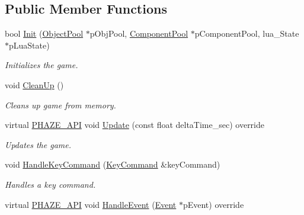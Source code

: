 \subsection*{Public Member Functions}
\begin{DoxyCompactItemize}
\item 
bool \mbox{\hyperlink{class_game_a083fc4d208482811d5dd6efb5c7fbaf4}{Init}} (\mbox{\hyperlink{class_object_pool}{Object\+Pool}} $\ast$p\+Obj\+Pool, \mbox{\hyperlink{class_component_pool}{Component\+Pool}} $\ast$p\+Component\+Pool, lua\+\_\+\+State $\ast$p\+Lua\+State)
\begin{DoxyCompactList}\small\item\em Initializes the game. \end{DoxyCompactList}\item 
\mbox{\label{class_game_afe8f2a4980f240bbfba8c1f495ff5075}} 
void \mbox{\hyperlink{class_game_afe8f2a4980f240bbfba8c1f495ff5075}{Clean\+Up}} ()
\begin{DoxyCompactList}\small\item\em Cleans up game from memory. \end{DoxyCompactList}\item 
virtual \mbox{\hyperlink{_macros_8h_a9ce0e6835f82908079752fa4ebe70dc9}{P\+H\+A\+Z\+E\+\_\+\+A\+PI}} void \mbox{\hyperlink{class_game_a49cc5bc8eee98577d72cd49dfc3c4af5}{Update}} (const float delta\+Time\+\_\+sec) override
\begin{DoxyCompactList}\small\item\em Updates the game. \end{DoxyCompactList}\item 
\mbox{\label{class_game_a622f72b9b81370d4d77f7b625a36fd75}} 
void \mbox{\hyperlink{class_game_a622f72b9b81370d4d77f7b625a36fd75}{Handle\+Key\+Command}} (\mbox{\hyperlink{class_key_command}{Key\+Command}} \&key\+Command)
\begin{DoxyCompactList}\small\item\em Handles a key command. \end{DoxyCompactList}\item 
\mbox{\label{class_game_a379673c1cde729d801e6f14f7b394810}} 
virtual \mbox{\hyperlink{_macros_8h_a9ce0e6835f82908079752fa4ebe70dc9}{P\+H\+A\+Z\+E\+\_\+\+A\+PI}} void \mbox{\hyperlink{class_game_a379673c1cde729d801e6f14f7b394810}{Handle\+Event}} (\mbox{\hyperlink{struct_event}{Event}} $\ast$p\+Event) override

\end{DoxyCompactItemize}
